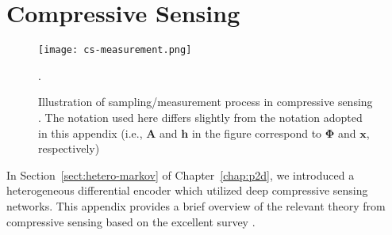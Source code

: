 \chapter{Compressive Sensing}
\label{appdx:compressed-sensing}

\begin{figure}[!hbtp] \centering 
    \texttt{[image: cs-measurement.png]}
    \label{fig:cs-measurement} \vspace*{-2mm}
    \caption{Illustration of sampling/measurement process in compressive sensing \cite{ref:Marques2019ReviewOfSparseRecovery}. The notation used here differs slightly from the notation adopted in this appendix (i.e., $\mathbf{A}$ and $\mathbf{h}$ in the figure correspond to $\mathbf{\Phi}$ and $\mathbf{x}$, respectively)}.
\end{figure}

In Section~\ref{sect:hetero-markov} of Chapter~\ref{chap:p2d}, we introduced a heterogeneous differential encoder which utilized deep compressive sensing networks. This appendix provides a brief overview of the relevant theory from compressive sensing based on the excellent survey \cite{ref:Marques2019ReviewOfSparseRecovery}.

